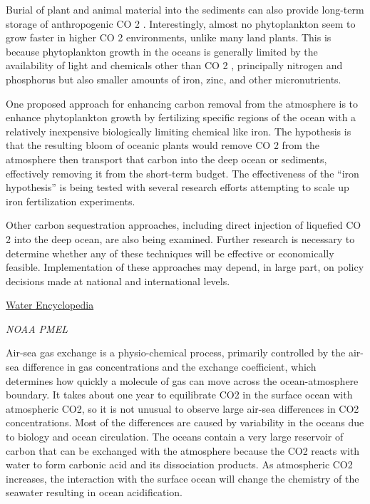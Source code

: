 \documentclass[
]{book}
\begin{document}
Burial of plant and animal material into the sediments can also provide long-term storage of anthropogenic CO 2 . Interestingly, almost no phytoplankton seem to grow faster in higher CO 2 environments, unlike many land plants. This is because phytoplankton growth in the oceans is generally limited by the availability of light and chemicals other than CO 2 , principally nitrogen and phosphorus but also smaller amounts of iron, zinc, and other micronutrients.

One proposed approach for enhancing carbon removal from the atmosphere is to enhance phytoplankton growth by fertilizing specific regions of the ocean with a relatively inexpensive biologically limiting chemical like iron. The hypothesis is that the resulting bloom of oceanic plants would remove CO 2 from the atmosphere then transport that carbon into the deep ocean or sediments, effectively removing it from the short-term budget. The effectiveness of the ``iron hypothesis'' is being tested with several research efforts attempting to scale up iron fertilization experiments.

Other carbon sequestration approaches, including direct injection of liquefied CO 2 into the deep ocean, are also being examined. Further research is necessary to determine whether any of these techniques will be effective or economically feasible. Implementation of these approaches may depend, in large part, on policy decisions made at national and international levels.

\href{http://www.waterencyclopedia.com/Bi-Ca/Carbon-Dioxide-in-the-Ocean-and-Atmosphere.html}{Water Encyclopedia}

\emph{NOAA PMEL}

Air-sea gas exchange is a physio-chemical process, primarily controlled by the air-sea difference in gas concentrations and the exchange coefficient, which determines how quickly a molecule of gas can move across the ocean-atmosphere boundary. It takes about one year to equilibrate CO2 in the surface ocean with atmospheric CO2, so it is not unusual to observe large air-sea differences in CO2 concentrations. Most of the differences are caused by variability in the oceans due to biology and ocean circulation. The oceans contain a very large reservoir of carbon that can be exchanged with the atmosphere because the CO2 reacts with water to form carbonic acid and its dissociation products. As atmospheric CO2 increases, the interaction with the surface ocean will change the chemistry of the seawater resulting in ocean acidification.
\end{document}
